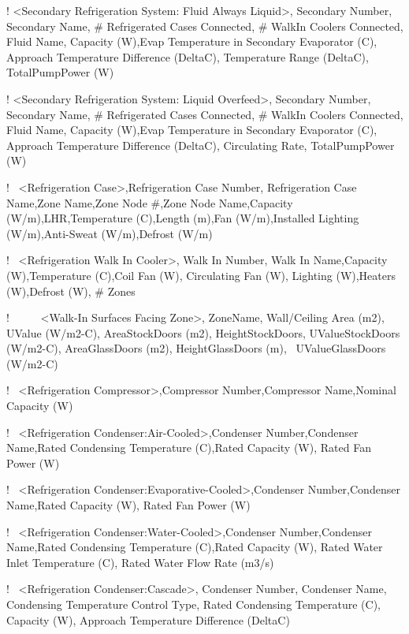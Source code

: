 ! \textless{}Secondary Refrigeration System: Fluid Always Liquid\textgreater{}, Secondary Number, Secondary Name, \# Refrigerated Cases Connected, \# WalkIn Coolers Connected, Fluid Name, Capacity (W),Evap Temperature in Secondary Evaporator (C), Approach Temperature Difference (DeltaC), Temperature Range (DeltaC), TotalPumpPower (W)

! \textless{}Secondary Refrigeration System: Liquid Overfeed\textgreater{}, Secondary Number, Secondary Name, \# Refrigerated Cases Connected, \# WalkIn Coolers Connected, Fluid Name, Capacity (W),Evap Temperature in Secondary Evaporator (C), Approach Temperature Difference (DeltaC), Circulating Rate, TotalPumpPower (W)

!~ \textless{}Refrigeration Case\textgreater{},Refrigeration Case Number, Refrigeration Case Name,Zone Name,Zone Node \#,Zone Node Name,Capacity (W/m),LHR,Temperature (C),Length (m),Fan (W/m),Installed Lighting (W/m),Anti-Sweat (W/m),Defrost (W/m)

!~ \textless{}Refrigeration Walk In Cooler\textgreater{}, Walk In Number, Walk In Name,Capacity (W),Temperature (C),Coil Fan (W), Circulating Fan (W), Lighting (W),Heaters (W),Defrost (W), \# Zones

!~~~~~ \textless{}Walk-In Surfaces Facing Zone\textgreater{}, ZoneName, Wall/Ceiling Area (m2), UValue (W/m2-C), AreaStockDoors (m2), HeightStockDoors, UValueStockDoors (W/m2-C), AreaGlassDoors (m2), HeightGlassDoors (m),~ UValueGlassDoors (W/m2-C)

!~ \textless{}Refrigeration Compressor\textgreater{},Compressor Number,Compressor Name,Nominal Capacity (W)

!~ \textless{}Refrigeration Condenser:Air-Cooled\textgreater{},Condenser Number,Condenser Name,Rated Condensing Temperature (C),Rated Capacity (W), Rated Fan Power (W)

!~ \textless{}Refrigeration Condenser:Evaporative-Cooled\textgreater{},Condenser Number,Condenser Name,Rated Capacity (W), Rated Fan Power (W)

!~ \textless{}Refrigeration Condenser:Water-Cooled\textgreater{},Condenser Number,Condenser Name,Rated Condensing Temperature (C),Rated Capacity (W), Rated Water Inlet Temperature (C), Rated Water Flow Rate (m3/s)

!~ \textless{}Refrigeration Condenser:Cascade\textgreater{}, Condenser Number, Condenser Name, Condensing Temperature Control Type, Rated Condensing Temperature (C), Capacity (W), Approach Temperature Difference (DeltaC)

